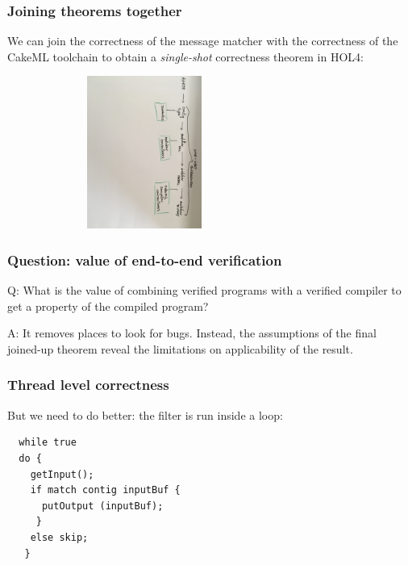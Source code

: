 \documentclass{beamer}
\begin{document}
\begin{frame}\frametitle{Joining theorems together}

  We can join the correctness of the message matcher with the
  correctness of the CakeML toolchain to obtain a \emph{single-shot}
  correctness theorem in HOL4:
  \vspace*{5mm}

  \includegraphics[width=90mm,height=50mm]{one-shot.jpg}

\end{frame}

\begin{frame}\frametitle{Question: value of end-to-end verification}

Q: What is the value of combining verified programs with a verified
   compiler to get a property of the compiled program?

A: It removes places to look for bugs. Instead, the assumptions of the
final joined-up theorem reveal the limitations on applicability of the
result.

\end{frame}


\begin{frame}[fragile]\frametitle{Thread level correctness}

But we need to do better: the filter is run inside a loop:

{\small
\begin{verbatim}
  while true
  do {
    getInput();
    if match contig inputBuf {
      putOutput (inputBuf);
     }
    else skip;
   }
\end{verbatim}
}
\end{frame}
\end{document}
